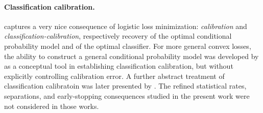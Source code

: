 \paragraph{Classification calibration.}  
captures a very nice consequence of logistic loss minimization:
\emph{calibration} and \emph{classification-calibration}, respectively
recovery of the optimal conditional probability model and of the
optimal classifier.  For more general convex losses, the ability
to construct a general conditional probability model was
developed by \citet{zhang_consistency} as a conceptual tool in establishing
classification calibration, but without explicitly controlling
calibration error. A further abstract treatment of classification
calibratoin was later presented by \citet{bartlett_jordan_mcauliffe}.
The refined statistical rates, separations, and early-stopping
consequences studied in the present work were not considered in those
works.